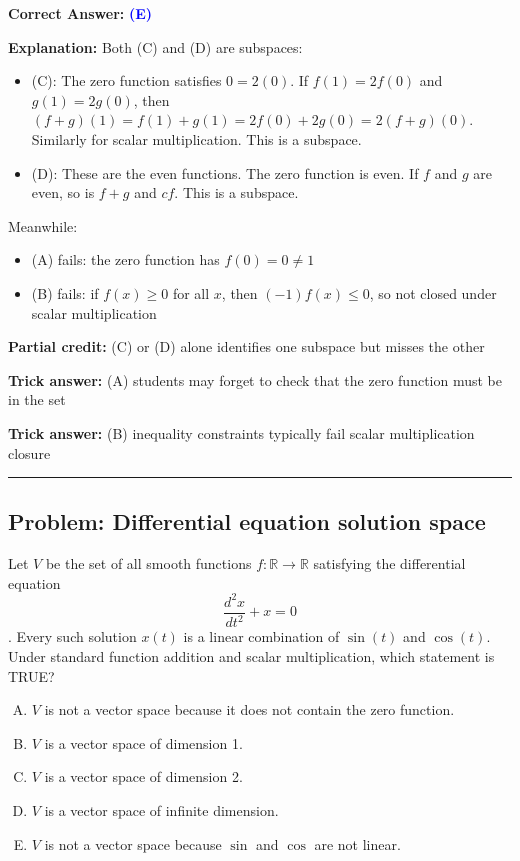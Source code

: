 \documentclass[12pt]{amsart}
\newcommand{\divider}{
  \vspace{-1em}
  \noindent
  \raisebox{-0.15ex}{\textbullet}%
  \hspace{0.5em}%
  \rule[0.5ex]{0.95\textwidth}{1.0pt}%
  \hspace{0.5em}%
  \raisebox{-0.15ex}{\textbullet}%
  \vspace{0em}
}
\begin{document}
\textbf{Correct Answer:} \textcolor{blue}{\textbf{(E)}}

\textbf{Explanation:} Both (C) and (D) are subspaces:
\begin{itemize}
\item (C): The zero function satisfies $0 = 2(0)$. If $f(1) = 2f(0)$ and $g(1) = 2g(0)$, then $(f+g)(1) = f(1)+g(1) = 2f(0)+2g(0) = 2(f+g)(0)$. Similarly for scalar multiplication. This is a subspace.
\item (D): These are the even functions. The zero function is even. If $f$ and $g$ are even, so is $f+g$ and $cf$. This is a subspace.
\end{itemize}
Meanwhile:
\begin{itemize}
\item (A) fails: the zero function has $f(0) = 0 \neq 1$
\item (B) fails: if $f(x) \geq 0$ for all $x$, then $(-1)f(x) \leq 0$, so not closed under scalar multiplication
\end{itemize}

\textbf{Partial credit:} (C) or (D) alone identifies one subspace but misses the other

\textbf{Trick answer:} (A) students may forget to check that the zero function must be in the set

\textbf{Trick answer:} (B) inequality constraints typically fail scalar multiplication closure

\divider

\subsection*{Problem: Differential equation solution space}

Let $V$ be the set of all smooth functions $f: \mathbb{R} \to \mathbb{R}$ satisfying the differential equation $$\frac{d^2x}{dt^2} + x = 0$$. Every such solution $x(t)$ is a linear combination of $\sin(t)$ and $\cos(t)$. Under standard function addition and scalar multiplication, which statement is TRUE?

\begin{enumerate}[(A)]
\item $V$ is not a vector space because it does not contain the zero function.
\item $V$ is a vector space of dimension 1.
\item $V$ is a vector space of dimension 2.
\item $V$ is a vector space of infinite dimension.
\item $V$ is not a vector space because $\sin$ and $\cos$ are not linear.
\end{enumerate}
\end{document}
